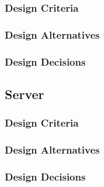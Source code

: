 \documentclass[ppfs.tex]{template/subfiles}
\begin{document}
\subsubsection{Design Criteria}

\subsubsection{Design Alternatives}

\subsubsection{Design Decisions}

\subsection{Server}

\subsubsection{Design Criteria}

\subsubsection{Design Alternatives}

\subsubsection{Design Decisions}
\end{document}
